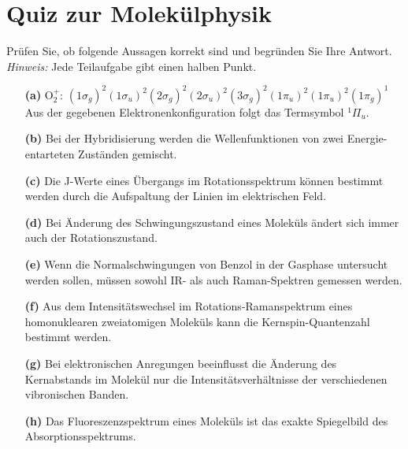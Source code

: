 \section{Quiz zur Molekülphysik}

Prüfen Sie, ob folgende Aussagen korrekt sind und begründen Sie Ihre Antwort. \\
\textit{Hinweis:} Jede Teilaufgabe gibt einen halben Punkt.

\vspace{0.2cm}

\begin{itemize}

\item[\textbf{(a)}] O$_2^+$: $(1\sigma_g)^2(1\sigma_u)^2(2\sigma_g)^2(2\sigma_u)^2(3\sigma_g)^2(1\pi_u)^2(1\pi_u)^2(1\pi_g)^1$ \\ Aus der gegebenen Elektronenkonfiguration folgt das Termsymbol $^1\Pi_u$. 

\item[\textbf{(b)}] Bei der Hybridisierung werden die Wellenfunktionen von zwei Energie-entarteten Zuständen gemischt.

\item[\textbf{(c)}] Die J-Werte eines Übergangs im Rotationsspektrum können bestimmt werden durch die Aufspaltung der Linien im elektrischen Feld.

\item[\textbf{(d)}] Bei Änderung des Schwingungszustand eines Moleküls ändert sich immer auch der Rotationszustand.

\item[\textbf{(e)}] Wenn die Normalschwingungen von Benzol in der Gasphase untersucht werden sollen, müssen sowohl IR- als auch Raman-Spektren gemessen werden.

\item[\textbf{(f)}]  Aus dem Intensitätswechsel im Rotations-Ramanspektrum eines homonuklearen zweiatomigen Moleküls kann die Kernspin-Quantenzahl bestimmt werden.

\item[\textbf{(g)}] Bei elektronischen Anregungen beeinflusst die Änderung des Kernabstands im Molekül nur die Intensitätsverhältnisse der verschiedenen vibronischen Banden.
 
\item[\textbf{(h)}] Das Fluoreszenzspektrum eines Moleküls ist das exakte Spiegelbild des Absorptionsspektrums.
	
\end{itemize}
